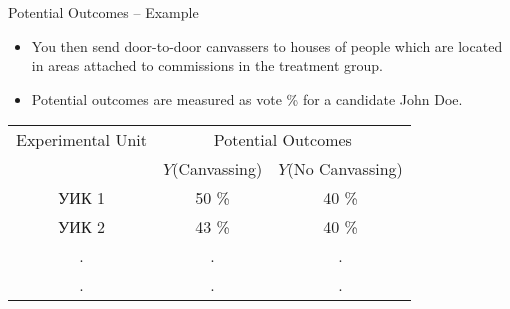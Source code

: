 \documentclass{beamer}
\begin{document}
\begin{frame}{Potential Outcomes -- Example}
\begin{itemize}
	\item You then send door-to-door canvassers to houses of people which are located in areas attached to commissions in the treatment group. 
	\item Potential outcomes are measured as vote \% for a candidate John Doe. 
\end{itemize}
\small
\begin{center}
	\begin{tabular}{  c  c  c }
		\hline\hline
		Experimental Unit & \multicolumn{2}{c}{Potential Outcomes} \\
		\cline{2-3}
		& $Y$(Canvassing) & $Y$(No Canvassing) \\
		\hline
		УИК 1 & 50 \% & 40 \% \\
		УИК 2 & 43 \% & 40 \% \\
		. & . & . \\
		. & . & . \\
		\hline\hline
	\end{tabular}
\end{center}
\end{frame}
\end{document}
